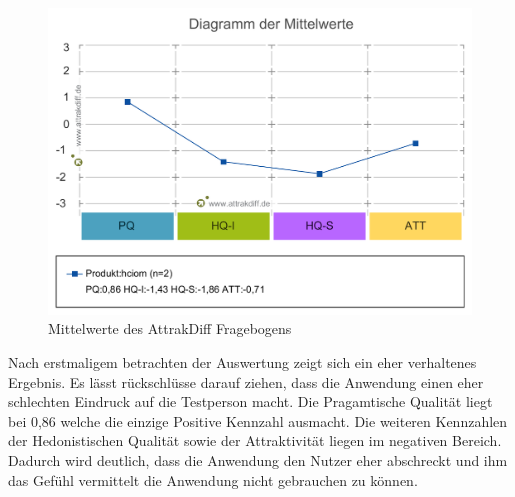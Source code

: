\documentclass[runningheads,a4paper, 12pt]{llncs}
\begin{document}
\begin{figure}[H]
	\centering
	\includegraphics[angle=0,scale=0.5]{attrakdiff_result2}
	\caption{Mittelwerte des AttrakDiff Fragebogens}
	\label{fig:result5}
\end{figure}

Nach erstmaligem betrachten der Auswertung zeigt sich ein eher verhaltenes Ergebnis. Es lässt rückschlüsse darauf ziehen, dass die Anwendung einen eher schlechten Eindruck auf die Testperson macht. Die Pragamtische Qualität liegt bei 0,86 welche die einzige Positive Kennzahl ausmacht. Die weiteren Kennzahlen der Hedonistischen Qualität sowie der Attraktivität liegen im negativen Bereich. Dadurch wird deutlich, dass die Anwendung den Nutzer eher abschreckt und ihm das Gefühl vermittelt die Anwendung nicht gebrauchen zu können.
\end{document}
